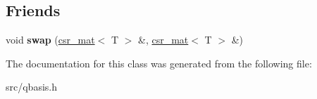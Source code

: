 \subsection*{Friends}
\begin{DoxyCompactItemize}
\item 
\mbox{\label{classqbasis_1_1csr__mat_afa8832c1ac943fd6538009ae544ac1f7}} 
void {\bfseries swap} (\hyperlink{classqbasis_1_1csr__mat}{csr\+\_\+mat}$<$ T $>$ \&, \hyperlink{classqbasis_1_1csr__mat}{csr\+\_\+mat}$<$ T $>$ \&)
\end{DoxyCompactItemize}


The documentation for this class was generated from the following file\+:\begin{DoxyCompactItemize}
\item 
src/qbasis.\+h\end{DoxyCompactItemize}
